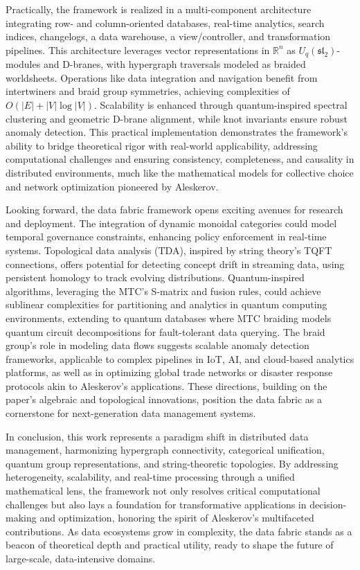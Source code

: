 \documentclass{amsart}
\newcommand\R{\mathbb R}
\begin{document}
Practically, the framework is realized in a multi-component architecture integrating row- and column-oriented databases, real-time analytics, search indices, changelogs, a data warehouse, a view/controller, and transformation pipelines. This architecture leverages vector representations in \( \R^{n} \) as \( U_q(\mathfrak{sl}_2) \)-modules and D-branes, with hypergraph traversals modeled as braided worldsheets. Operations like data integration and navigation benefit from intertwiners and braid group symmetries, achieving complexities of \( O(|E| + |V| \log |V|) \). Scalability is enhanced through quantum-inspired spectral clustering and geometric D-brane alignment, while knot invariants ensure robust anomaly detection. This practical implementation demonstrates the framework’s ability to bridge theoretical rigor with real-world applicability, addressing computational challenges and ensuring consistency, completeness, and causality in distributed environments, much like the mathematical models for collective choice and network optimization pioneered by Aleskerov.

Looking forward, the data fabric framework opens exciting avenues for research and deployment. The integration of dynamic monoidal categories could model temporal governance constraints, enhancing policy enforcement in real-time systems. Topological data analysis (TDA), inspired by string theory’s TQFT connections, offers potential for detecting concept drift in streaming data, using persistent homology to track evolving distributions. Quantum-inspired algorithms, leveraging the MTC’s S-matrix and fusion rules, could achieve sublinear complexities for partitioning and analytics in quantum computing environments, extending to quantum databases where MTC braiding models quantum circuit decompositions for fault-tolerant data querying. The braid group’s role in modeling data flows suggests scalable anomaly detection frameworks, applicable to complex pipelines in IoT, AI, and cloud-based analytics platforms, as well as in optimizing global trade networks or disaster response protocols akin to Aleskerov’s applications. These directions, building on the paper’s algebraic and topological innovations, position the data fabric as a cornerstone for next-generation data management systems.

In conclusion, this work represents a paradigm shift in distributed data management, harmonizing hypergraph connectivity, categorical unification, quantum group representations, and string-theoretic topologies. By addressing heterogeneity, scalability, and real-time processing through a unified mathematical lens, the framework not only resolves critical computational challenges but also lays a foundation for transformative applications in decision-making and optimization, honoring the spirit of Aleskerov’s multifaceted contributions. As data ecosystems grow in complexity, the data fabric stands as a beacon of theoretical depth and practical utility, ready to shape the future of large-scale, data-intensive domains.

%
 


\end{document}
